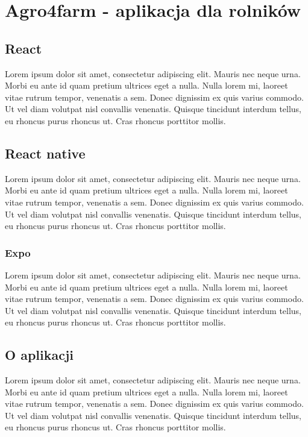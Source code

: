\documentclass[a4paper,12pt,oneside]{book}
\begin{document}
	\newpage
	\chapter{Agro4farm - aplikacja dla rolników}
	
	\section{React}
	Lorem ipsum dolor sit amet, consectetur adipiscing elit. Mauris nec neque urna. Morbi eu ante id quam pretium ultrices eget a nulla. Nulla lorem mi, laoreet vitae rutrum tempor, venenatis a sem. Donec dignissim ex quis varius commodo. Ut vel diam volutpat nisl convallis venenatis. Quisque tincidunt interdum tellus, eu rhoncus purus rhoncus ut. Cras rhoncus porttitor mollis.
	
	\section{React native}
	Lorem ipsum dolor sit amet, consectetur adipiscing elit. Mauris nec neque urna. Morbi eu ante id quam pretium ultrices eget a nulla. Nulla lorem mi, laoreet vitae rutrum tempor, venenatis a sem. Donec dignissim ex quis varius commodo. Ut vel diam volutpat nisl convallis venenatis. Quisque tincidunt interdum tellus, eu rhoncus purus rhoncus ut. Cras rhoncus porttitor mollis.
	
	\subsection{Expo}
	Lorem ipsum dolor sit amet, consectetur adipiscing elit. Mauris nec neque urna. Morbi eu ante id quam pretium ultrices eget a nulla. Nulla lorem mi, laoreet vitae rutrum tempor, venenatis a sem. Donec dignissim ex quis varius commodo. Ut vel diam volutpat nisl convallis venenatis. Quisque tincidunt interdum tellus, eu rhoncus purus rhoncus ut. Cras rhoncus porttitor mollis.
	
	\section{O aplikacji}
	Lorem ipsum dolor sit amet, consectetur adipiscing elit. Mauris nec neque urna. Morbi eu ante id quam pretium ultrices eget a nulla. Nulla lorem mi, laoreet vitae rutrum tempor, venenatis a sem. Donec dignissim ex quis varius commodo. Ut vel diam volutpat nisl convallis venenatis. Quisque tincidunt interdum tellus, eu rhoncus purus rhoncus ut. Cras rhoncus porttitor mollis.
	
\end{document}

